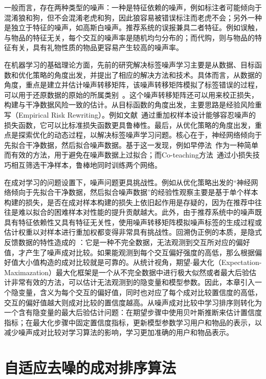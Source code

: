 一般而言，存在两种类型的噪声：一种是特征依赖的噪声\cite{Menon:2018:ML}，例如标注者可能倾向于混淆狼和狗，但不会混淆老虎和狗，因此狼容易被错误标注而老虎不会；另外一种是独立于特征的噪声\cite{patrini:2017:CVPR}，如高斯白噪声。推荐系统的误报兼具二者特征。例如误触，与物品的特征无关，每个交互的噪声率是随机均匀分布的；而代购，则与物品的特征有关，具有礼物性质的物品更容易产生较高的噪声率。

在机器学习的基础理论方面，先前的研究解决标签噪声学习主要是从数据、目标函数和优化策略的角度出发，并提出了相应的解决方法和技术。具体而言，从数据的角度，重点是建立并估计噪声转移矩阵，该噪声转移矩阵模拟了标签错误的过程，可以用于还原数据的原始的所属类别~\cite{Van:2017:JMLR}。这个噪声转移矩阵还可以用来校正损失，构建与干净数据风险一致的估计\cite{xia:2019:NIPS}。从目标函数的角度出发，主要思路是经验风险重写（Empirical Risk Rewriting）。例如文献~\cite{liu2015classification}通过重加权样本设计能够容忍噪声的损失函数，它可以比标准损失函数更具鲁棒性。最后，从优化策略的角度出发，重点是探索优化的动态过程，以解决标签噪声学习问题。核心在于，神经网络倾向于先拟合干净数据，然后拟合噪声数据\cite{zhang2021understanding}。基于这一发现，例如早停法~\cite{li2020gradient}作为一种简单而有效的方法，用于避免在噪声数据上过拟合；而Co-teaching方法~\cite{Han:2018:NIPS}通过小损失技巧相互筛选干净样本，鲁棒地同时训练两个网络。

在成对学习的问题设置下，噪声问题更具挑战性。例如从优化策略出发的“神经网络倾向于先拟合干净数据，然后拟合噪声数据”的经验性观察主要是基于单个样本构建的损失，是否在成对样本构建的损失上依旧起作用是存疑的，因为在推荐中往往是难以拟合的困难样本对性能的提升贡献越大\cite{Steffen:2014:WSDM}。此外，由于推荐系统中的噪声既具有特征依赖性又具有特征无关性，使用噪声转移矩阵模拟噪声标签的生成过程或估计权重以对样本进行重加权都变得非常具有挑战性。回溯伪正例的本质，是隐式反馈数据的特性造成的
：它是一种不完全数据，无法观测到交互所对应的偏好值，才产生了噪声成对比较。如果能观测到每个交互偏好强度的高低，那么根据偏好值大小值构造的成对比较就是可靠的。从统计视角，期望-最大化（Expectation-Maximazation）最大化框架是一个从不完全数据中进行极大似然或者最大后验估计非常有效的方法，可以估计无法观测到的隐变量和模型参数。因此，本章引入一个隐变量，含义为每个交互的偏好值，同时也对应了每个成对比较置信度的高低，交互的偏好值越大则成对比较的置信度越高。从噪声成对比较中学习排序则转化为一个含有隐变量的最大后验估计问题：在期望步骤中使用贝叶斯推断来估计置信度指标；在最大化步骤中固定置信度指标，更新模型参数学习用户和物品的表示，以减少噪声成对比较对学习算法的影响，学习更加准确的用户和物品表示。

\section{自适应去噪的成对排序算法}
